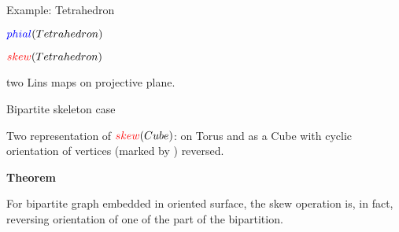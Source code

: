 \documentclass[%
pdf,
colorBG,
slideColor,
]{prosper}
\begin{document}
\begin{slide}{Example: Tetrahedron}
\begin{center}
\begin{minipage}{50mm}
\par
$\textcolor{blue}{phial}(Tetrahedron)$
\end{minipage}
\begin{minipage}{50mm}
\par
$\textcolor{red}{skew}(Tetrahedron)$
\end{minipage}
\end{center}
\begin{center}
two Lins maps on projective plane.
\end{center}

\end{slide}





\begin{slide}{Bipartite skeleton case}

\begin{center}
\begin{minipage}{50mm}
\end{minipage}
\begin{minipage}{50mm}
\end{minipage}
\end{center}
\begin{center}
Two representation of $\textcolor{red}{skew}(Cube)$: on Torus and as a Cube with cyclic orientation of vertices (marked by ) reversed.
\end{center}
{\it 

{\bf Theorem}

For bipartite graph embedded in oriented surface, the skew operation is, in fact, reversing orientation of one of the part of the bipartition.

}




\end{slide}
\end{document}
